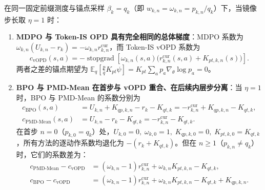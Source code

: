 \documentclass[lang=cn,scheme=chinese,openany]{elegantbook}
\newcommand{\E}{\mathbb E}
\newcommand{\sg}{\operatorname{stopgrad}}
\begin{document}
\begin{proposition}[$\eta=1$ 时 MDPO 与 Token-IS OPD 的总体等价及 BPO/Mean 的多步分离]
\label{opd:objective-family}
\label{opd:eta-one-mdpo}
在同一固定前缀测度与锚点采样 $\beta_k=q_k$（即 $w_{k,n}=\omega_{k,n}=p_{k,n}/q_k$）下，当镜像步长取 $\eta=1$ 时：
\begin{enumerate}
\item \textbf{MDPO 与 Token-IS OPD 具有完全相同的总体梯度}：MDPO 系数为 $\omega_{k,n}(U_{k,n}-r_k)=-\omega_{k,n}r_{k,n}^{\mathrm{cur}}$，而 Token-IS vOPD 系数为
\begin{equation}
\label{eq:ch2-vopd-token-is-coef}
c_{\mathrm{vOPD}}(s,a)
=-\sg\!\left[
\omega_{k,n}(s,a)\bigl(r_{k,n}^{\mathrm{cur}}(s,a)+K_{pt,k,n}(s)\bigr)
\right].
\end{equation}
两者之差的锚点期望为 $\E_q[\frac{p}{q}K_{pt}\psi]=K_{pt}\sum_a p_a\nabla_\theta\log p_a=0$。
\item \textbf{BPO 与 PMD-Mean 在首步与 vOPD 重合、在后续内层步分离}：当 $\eta=1$ 时，BPO 与 PMD-Mean 的系数分别为
\begin{align}
c_{\mathrm{BPO}}(s,a)
&=U_{k,n}+K_{qp,k,n}-r_k-K_{qt,k}
 =-r_{k,n}^{\mathrm{cur}}+K_{qp,k,n}-K_{qt,k},
\label{eq:ch2-bpo-eta-one}\\
c_{\mathrm{PMD\text{-}Mean}}(s,a)
&=U_{k,n}-r_k-K_{qt,k}
 =-r_{k,n}^{\mathrm{cur}}-K_{qt,k}.
\label{eq:ch2-pmd-mean-eta-one}
\end{align}
在首步 $n=0$（$p_{k,0}=q_k$）处，$U_{k,0}=0,\;\omega_{k,0}=1,\;K_{qp,k,0}=0,\;K_{pt,k,0}=K_{qt,k}$，所有方法的逐动作系数均退化为 $-(r_k+K_{qt,k})$。但在 $n\ge 1$（$p_{k,n}\ne q_k$）时，它们的系数差为：
\begin{align}
c_{\mathrm{PMD\text{-}Mean}}-c_{\mathrm{vOPD}}
&=(\omega_{k,n}-1)r_{k,n}^{\mathrm{cur}}
 +\omega_{k,n}K_{pt,k,n}-K_{qt,k},\\
c_{\mathrm{BPO}}-c_{\mathrm{vOPD}}
&=(\omega_{k,n}-1)r_{k,n}^{\mathrm{cur}}
 +\omega_{k,n}K_{pt,k,n}-K_{qt,k}
 +K_{qp,k,n}.
\end{align}
\end{enumerate}
\end{proposition}
\end{document}
